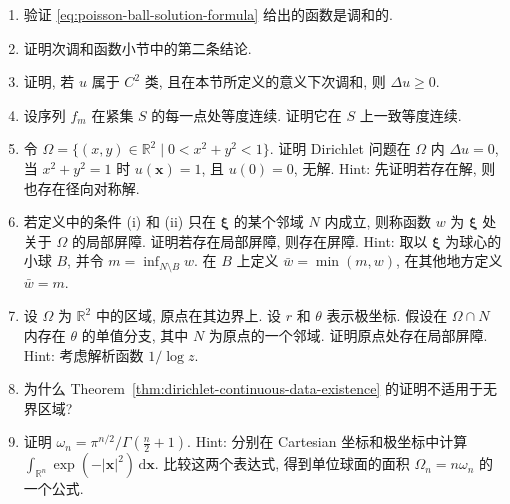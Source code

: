\begin{enumerate}[label=\thesection.\arabic*.,ref=\thesection.\arabic*,start=8,series=book-problems]

\item\label{ex:poisson-formula-harmonicity} 验证 \eqref{eq:poisson-ball-solution-formula} 给出的函数是调和的.

\item\label{ex:subharmonic-harmonic-lifting} 证明次调和函数小节中的第二条结论.

\item\label{ex:smooth-subharmonic-laplacian} 证明, 若 $u$ 属于 $C^2$ 类, 且在本节所定义的意义下次调和, 则 $\Delta u\geq0$.

\item\label{ex:compact-equicontinuity-uniform} 设序列 $f_m$ 在紧集 $S$ 的每一点处等度连续. 证明它在 $S$ 上一致等度连续.

\item\label{ex:punctured-disk-dirichlet-nonexistence} 令 $\Omega=\{(x,y)\in\mathbb{R}^2\mid0<x^2+y^2<1\}$. 证明 Dirichlet 问题在 $\Omega$ 内 $\Delta u=0$, 当 $x^2+y^2=1$ 时 $u(\bm{x})=1$, 且 $u(0)=0$, 无解. Hint: 先证明若存在解, 则也存在径向对称解.

\item\label{ex:local-barrier-to-global-barrier} 若定义中的条件 (i) 和 (ii) 只在 $\bm{\xi}$ 的某个邻域 $N$ 内成立, 则称函数 $w$ 为 $\bm{\xi}$ 处关于 $\Omega$ 的局部屏障. 证明若存在局部屏障, 则存在屏障. Hint: 取以 $\bm{\xi}$ 为球心的小球 $B$, 并令 $m=\inf_{N\setminus B}w$. 在 $B$ 上定义 $\bar w=\min(m,w)$, 在其他地方定义 $\bar w=m$.

\item\label{ex:planar-local-logarithmic-barrier} 设 $\Omega$ 为 $\mathbb{R}^2$ 中的区域, 原点在其边界上. 设 $r$ 和 $\theta$ 表示极坐标. 假设在 $\Omega\cap N$ 内存在 $\theta$ 的单值分支, 其中 $N$ 为原点的一个邻域. 证明原点处存在局部屏障. Hint: 考虑解析函数 $1/\log z$.

\item\label{ex:perron-proof-unbounded-domain} 为什么 Theorem~\ref{thm:dirichlet-continuous-data-existence} 的证明不适用于无界区域?

\item\label{ex:unit-ball-volume-gamma-function} 证明 $\omega_n=\pi^{n/2}/\Gamma(\frac n2+1)$. Hint: 分别在 Cartesian 坐标和极坐标中计算 \allowbreak $\int_{\mathbb{R}^n}\exp(-|\bm{x}|^2)\,\mathrm{d}\bm{x}$. 比较这两个表达式, 得到单位球面的面积 $\Omega_n=n\omega_n$ 的一个公式.

\end{enumerate}
